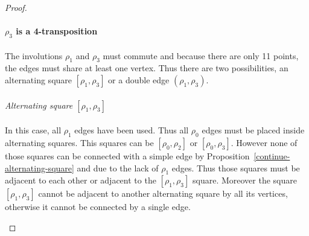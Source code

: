 \begin{proof}
  \paragraph{}
  \textbf{$\rho_3$ is a 4-transposition}

  \paragraph{}
  The involutions $\rho_1$ and $\rho_3$ must commute and because there are only 11 points, the edges must share at least one vertex. Thus there are two possibilities, an alternating square $[\rho_1, \rho_3]$ or a double edge $(\rho_1, \rho_3)$.

  \paragraph{}
  \textit{Alternating square $[\rho_1, \rho_3]$}

  \paragraph{}
  In this case, all $\rho_1$ edges have been used. Thus all $\rho_0$ edges must be placed inside alternating squares. This squares can be $[\rho_0, \rho_2]$ or $[\rho_0, \rho_3]$. However none of those squares can be connected with a simple edge by Proposition~\ref{continue-alternating-square} and due to the lack of $\rho_1$ edges. Thus those squares must be adjacent to each other or adjacent to the $[\rho_1, \rho_3]$ square. Moreover the square $[\rho_1, \rho_3]$ cannot be adjacent to another alternating square by all its vertices, otherwise it cannot be connected by a single edge.

  \begin{figure}[H]
    \begin{center}
\end{center}
\end{figure}
\end{proof}

